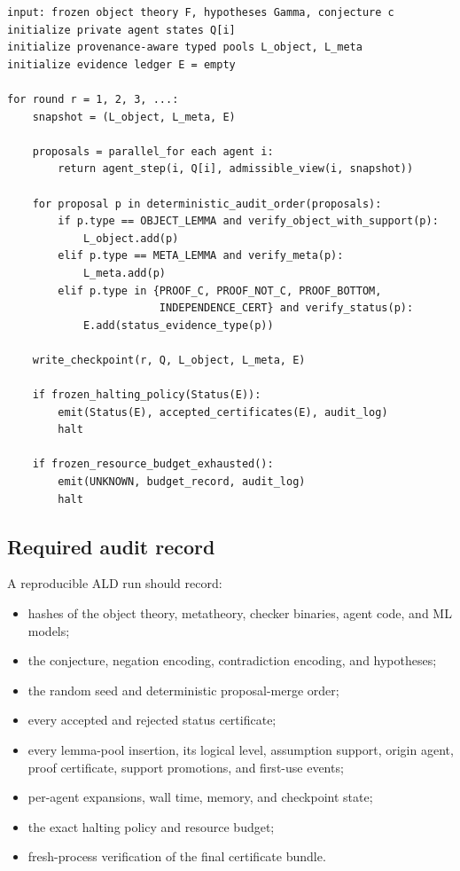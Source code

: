 \documentclass[11pt]{article}
\theoremstyle{definition}
\theoremstyle{remark}
\begin{document}
\begin{lstlisting}[caption={Auditable round-synchronous ALD skeleton}]
input: frozen object theory F, hypotheses Gamma, conjecture c
initialize private agent states Q[i]
initialize provenance-aware typed pools L_object, L_meta
initialize evidence ledger E = empty

for round r = 1, 2, 3, ...:
    snapshot = (L_object, L_meta, E)

    proposals = parallel_for each agent i:
        return agent_step(i, Q[i], admissible_view(i, snapshot))

    for proposal p in deterministic_audit_order(proposals):
        if p.type == OBJECT_LEMMA and verify_object_with_support(p):
            L_object.add(p)
        elif p.type == META_LEMMA and verify_meta(p):
            L_meta.add(p)
        elif p.type in {PROOF_C, PROOF_NOT_C, PROOF_BOTTOM,
                        INDEPENDENCE_CERT} and verify_status(p):
            E.add(status_evidence_type(p))

    write_checkpoint(r, Q, L_object, L_meta, E)

    if frozen_halting_policy(Status(E)):
        emit(Status(E), accepted_certificates(E), audit_log)
        halt

    if frozen_resource_budget_exhausted():
        emit(UNKNOWN, budget_record, audit_log)
        halt
\end{lstlisting}

\subsection{Required audit record}
A reproducible ALD run should record:
\begin{itemize}
  \item hashes of the object theory, metatheory, checker binaries, agent code, and ML models;
  \item the conjecture, negation encoding, contradiction encoding, and hypotheses;
  \item the random seed and deterministic proposal-merge order;
  \item every accepted and rejected status certificate;
  \item every lemma-pool insertion, its logical level, assumption support, origin agent, proof certificate, support promotions, and first-use events;
  \item per-agent expansions, wall time, memory, and checkpoint state;
  \item the exact halting policy and resource budget;
  \item fresh-process verification of the final certificate bundle.
\end{itemize}
\end{document}
